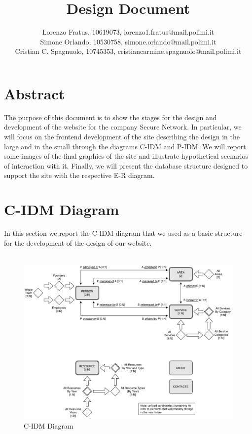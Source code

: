\documentclass[12pt]{report}
\title{Design Document}
\author{Lorenzo Fratus, 10619073, lorenzo1.fratus@mail.polimi.it \\
Simone Orlando, 10530758, simone.orlando@mail.polimi.it \\
Cristian C. Spagnuolo, 10745353, cristiancarmine.spagnuolo@mail.polimi.it}
\begin{document}
\maketitle
\tableofcontents

\chapter{Abstract}
The purpose of this document is to show the stages for the design and 
development of the website for the company Secure Network. 
In particular, we will focus on the frontend development of 
the site describing the design in the large and in the small 
through the diagrams C-IDM and P-IDM. 
We will report some images of the final graphics of the site and 
illustrate hypothetical scenarios of interaction with it. 
Finally, we will present the database structure designed to support the site with the 
respective E-R diagram.

\chapter{C-IDM Diagram}
In this section we report the C-IDM diagram that we used as a basic structure for 
the development of the design of our website.\\\\
\begin{figure}[h]
	\centering
	\includegraphics[width=\textwidth]{C-IDM.pdf}
	\caption{C-IDM Diagram}
\end{figure}
\end{document}
